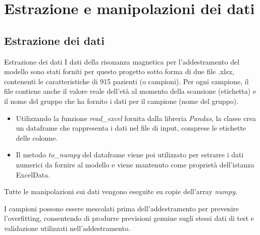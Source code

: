 \documentclass{beamer}
\begin{document}
\section{Estrazione e manipolazioni dei dati}
\subsection*{Estrazione dei dati}
\begin{frame}{Estrazione dei dati}
I dati della risonanza magnetica per l'addestramento del modello sono stati forniti per questo progetto sotto forma di due file .xlsx, contenenti le caratteristiche di 915 pazienti (o campioni). Per ogni campione, il file contiene anche il valore reale dell'età al momento della scansione (etichetta) e il nome del gruppo che ha fornito i dati per il campione (nome del gruppo).
\pause
\begin{itemize}
\item Utilizzando la funzione \emph{read\_excel} fornita dalla libreria \emph{Pandas}, la classe crea un dataframe che rappresenta i dati nel file di input, comprese le etichette delle colonne.
\pause
\item Il metodo \emph{to\_numpy} del dataframe viene poi utilizzato per estrarre i dati numerici da fornire al modello e viene mantenuto come proprietà dell'istanza ExcelData.
\end{itemize}
\pause
Tutte le manipolazioni sui dati vengono eseguite su copie dell'array \emph{numpy}.

I campioni possono essere mescolati prima dell'addestramento per prevenire l'overfitting, consentendo di produrre previsioni genuine sugli stessi dati di test e validazione utilizzati nell'addestramento.
\end{frame}


\end{document}
